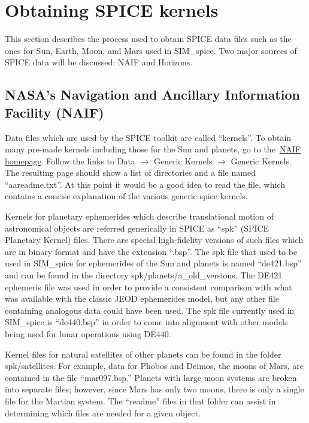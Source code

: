 \section{Obtaining SPICE kernels}
This section describes the process used to obtain SPICE data files such as
the ones for Sun, Earth, Moon, and Mars used in SIM\_spice.  Two major sources
of SPICE data will be discussed: NAIF and Horizons.


\subsection {NASA's Navigation and Ancillary Information Facility (NAIF)}
\label{subsec:naif}
Data files which are used by the SPICE toolkit are called ``kernels''.  To
obtain many pre-made kernels including those for the Sun and planets, go to
the~\href{http://naif.jpl.nasa.gov/naif}{NAIF homepage}. Follow the links to
Data $\to$ Generic Kernels $\to$ Generic Kernels.  The resulting page should
show a list of directories and a file named ``aareadme.txt''.  At this point
it would be a good idea to read the file, which contains a concise explanation
of the various generic spice kernels.

Kernels for planetary ephemerides which describe translational motion of
astronomical objects are referred generically in SPICE as ``spk''
(SPICE Planetary Kernel) files. There are special high-fidelity versions of
such files which are in binary format and have the extension ``.bsp''.
The spk file that used to be used in SIM\_spice for ephemerides of the Sun and
planets is named ``de421.bsp'' and can be found in the directory
spk/planets/a\_old\_versions. The DE421 ephemeris file was used in order to
provide a consistent comparison with what was available with the classic JEOD
ephemerides model, but any other file containing analogous data could have
been used. The spk file currently used in SIM\_spice is ``de440.bsp'' in order to
come into alignment with other models being used for lunar operations using DE440.

Kernel files for natural satellites of other planets can be found in the
folder spk/satellites. For example, data for Phobos and Deimos, the moons of
Mars, are contained in the file ``mar097.bsp.''  Planets with large moon
systems are broken into separate files; however, since Mars has only two
moons, there is only a single file for the Martian system. The ``readme''
files in that folder can assist in determining which files are needed for
a given object.


